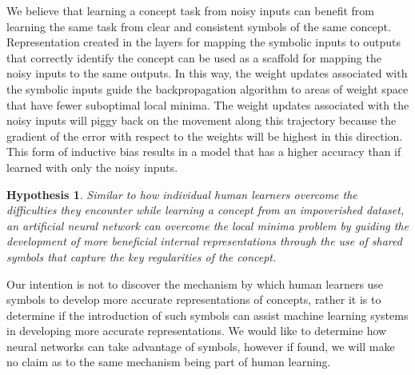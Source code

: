 We believe that learning a concept task from noisy inputs can benefit from learning the same task from clear and consistent symbols of the same concept.  Representation created in the layers for mapping the symbolic inputs to outputs that correctly identify the concept can be used as a scaffold for mapping the noisy inputs to the same outputs. In this way, the weight updates associated with the symbolic inputs guide the backpropagation algorithm to areas of weight space that have fewer suboptimal local minima. The weight updates associated with the noisy inputs will piggy back on the movement along this trajectory because the gradient of the error with respect to the weights will be highest in this direction. This form of inductive bias results in a model that has a higher accuracy than if learned with only the noisy inputs.

\newtheorem*{symbolic-learninig-hypothesis*}{Hypothesis}

\begin{symbolic-learninig-hypothesis*}
	\label{hypothesis:symbolic-learninig-hypothesis}
	Similar to how individual human learners overcome the difficulties they encounter while learning a concept from an impoverished dataset, an artificial neural network can overcome the local minima problem by guiding the development of more beneficial internal representations through the use of shared symbols that capture the key regularities of the concept.
\end{symbolic-learninig-hypothesis*}

Our intention is not to discover the mechanism by which human learners use symbols to develop more accurate representations of concepts, rather it is to determine if the introduction of such symbols can assist machine learning systems in developing more accurate representations. We would like to determine how neural networks can take advantage of symbols, however if found, we will make no claim as to the same mechanism being part of human learning.

